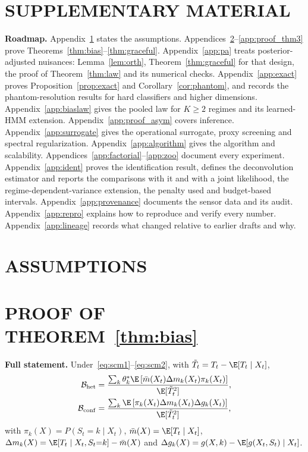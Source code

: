 \allowdisplaybreaks
\setlength{\emergencystretch}{3em}
\renewcommand{\arraystretch}{0.95}

\section*{SUPPLEMENTARY MATERIAL}
\noindent\textbf{Roadmap.}
Appendix~\ref{app:assumptions} states the assumptions.
Appendices~\ref{app:proof_thm1}--\ref{app:proof_thm3} prove Theorems~\ref{thm:bias}--\ref{thm:graceful}.
Appendix~\ref{app:pa} treats posterior-adjusted nuisances: Lemma~\ref{lem:orth}, Theorem~\ref{thm:graceful} for that design, the proof of Theorem~\ref{thm:law} and its numerical checks.
Appendix~\ref{app:exact} proves Proposition~\ref{prop:exact} and Corollary~\ref{cor:phantom}, and records the phantom-resolution results for hard classifiers and higher dimensions.
Appendix~\ref{app:biaslaw} gives the pooled law for $K\ge2$ regimes and its learned-HMM extension.
Appendix~\ref{app:proof_asym} covers inference.
Appendix~\ref{app:surrogate} gives the operational surrogate, proxy screening and spectral regularization.
Appendix~\ref{app:algorithm} gives the algorithm and scalability.
Appendices~\ref{app:factorial}--\ref{app:zoo} document every experiment.
Appendix~\ref{app:ident} proves the identification result, defines the deconvolution estimator and reports the comparisons with it and with a joint likelihood, the regime-dependent-variance extension, the penalty used and budget-based intervals.
Appendix~\ref{app:provenance} documents the sensor data and its audit.
Appendix~\ref{app:repro} explains how to reproduce and verify every number.
Appendix~\ref{app:lineage} records what changed relative to earlier drafts and why.

\section{ASSUMPTIONS}
\label{app:assumptions}

\section{PROOF OF THEOREM~\ref{thm:bias}}
\label{app:proof_thm1}
\textbf{Full statement.} Under~\eqref{eq:scm1}--\eqref{eq:scm2}, with $\tilde T_t=T_t-\E[T_t\mid X_t]$,
\begin{align}
\mathcal{B}_{\mathrm{het}} &= \frac{\sum_{k} \theta_k^* \E\left[ \bar{m}(X_t) \Delta m_k(X_t) \pi_k(X_t) \right]}{\E[\tilde{T}_t^2]}, \label{eq:b_het} \\
\mathcal{B}_{\mathrm{conf}} &= \frac{\sum_{k} \E\left[ \pi_k(X_t) \Delta m_k(X_t) \Delta g_k(X_t) \right]}{\E[\tilde{T}_t^2]}, \label{eq:b_conf}
\end{align}
with $\pi_k(X)=P(S_t{=}k\mid X_t)$, $\bar m(X)=\E[T_t\mid X_t]$, $\Delta m_k(X)=\E[T_t\mid X_t,S_t{=}k]-\bar m(X)$ and $\Delta g_k(X)=g(X,k)-\E[g(X_t,S_t)\mid X_t]$.


